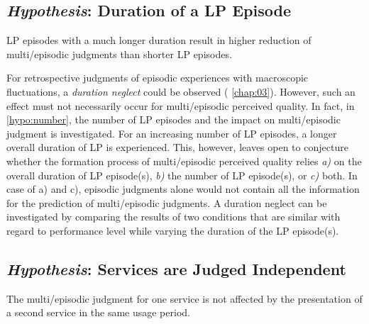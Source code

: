 \subsection[H6: Duration of a \acs{LP} Episode]{\emph{Hypothesis}: Duration of a \acs{LP} Episode}
\begin{hypothesis}\label{hypo:duration}
\ac{LP} episodes with a much longer duration result in higher reduction of multi\-/episodic judgments than shorter \ac{LP} episodes.
\end{hypothesis}

For retrospective judgments of episodic experiences with macroscopic fluctuations, a \emph{duration neglect} could be observed (\cf{} \autoref{chap:03}).
However, such an effect must not necessarily occur for multi\-/episodic perceived quality.
In fact, in \autoref{hypo:number}, the number of \ac{LP} episodes and the impact on multi\-/episodic judgment is investigated.
For an increasing number of \ac{LP} episodes, a longer overall duration of \ac{LP} is experienced.
This, however, leaves open to conjecture whether the formation process of multi\-/episodic perceived quality relies \emph{a)} on the overall duration of \ac{LP} episode(s), \emph{b)} the number of \ac{LP} episode(s), or \emph{c)} both.
In case of a) and c), episodic judgments alone would not contain all the information for the prediction of multi\-/episodic judgments.
A duration neglect can be investigated by comparing the results of two conditions that are similar with regard to performance level while varying the duration of the \ac{LP} episode(s).

\subsection[H7: Services are Judged Independent]{\emph{Hypothesis}: Services are Judged Independent}
\begin{hypothesis}\label{hypo:independent}
The multi\-/episodic judgment for one service is not affected by the presentation of a second service in the same usage period.
\end{hypothesis}

